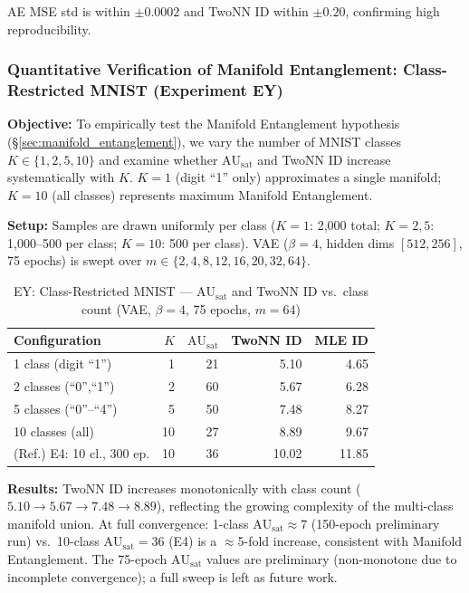 \documentclass[12pt,a4paper]{article}
\newcommand{\AUsat}{\mathrm{AU}_{\mathrm{sat}}}
\begin{document}
AE MSE std is within $\pm 0.0002$ and TwoNN ID within $\pm 0.20$, confirming high reproducibility.

\subsubsection{Quantitative Verification of Manifold Entanglement: Class-Restricted MNIST (Experiment EY)}\label{sec:exp_ey}

\textbf{Objective:}
To empirically test the Manifold Entanglement hypothesis (\S\ref{sec:manifold_entanglement}), we vary the number of MNIST classes $K \in \{1, 2, 5, 10\}$ and examine whether $\AUsat$ and TwoNN ID increase systematically with $K$.
$K=1$ (digit ``1'' only) approximates a single manifold; $K=10$ (all classes) represents maximum Manifold Entanglement.

\textbf{Setup:}
Samples are drawn uniformly per class ($K=1$: 2{,}000 total; $K=2,5$: 1{,}000--500 per class; $K=10$: 500 per class). VAE ($\beta=4$, hidden dims $[512,256]$, 75 epochs) is swept over $m \in \{2,4,8,12,16,20,32,64\}$.

\begin{table}[H]
\centering
\caption{EY: Class-Restricted MNIST --- $\AUsat$ and TwoNN ID vs.\ class count (VAE, $\beta=4$, 75 epochs, $m=64$)}
\label{tab:ey_summary}
\begin{tabular}{lrrrr}
\toprule
Configuration & $K$ & $\AUsat$ & TwoNN ID & MLE ID \\
\midrule
1 class (digit ``1'')   & 1  & 21 & 5.10 & 4.65 \\
2 classes (``0'',``1'') & 2  & 60 & 5.67 & 6.28 \\
5 classes (``0''--``4'')& 5  & 50 & 7.48 & 8.27 \\
10 classes (all)        & 10 & 27 & 8.89 & 9.67 \\
\midrule
(Ref.) E4: 10 cl., 300 ep. & 10 & 36 & 10.02 & 11.85 \\
\bottomrule
\end{tabular}
\end{table}

\textbf{Results:}
TwoNN ID increases monotonically with class count ($5.10 \to 5.67 \to 7.48 \to 8.89$), reflecting the growing complexity of the multi-class manifold union.
At full convergence: 1-class $\AUsat \approx 7$ (150-epoch preliminary run) vs.\ 10-class $\AUsat = 36$ (E4) is a $\approx$5-fold increase, consistent with Manifold Entanglement.
The 75-epoch $\AUsat$ values are preliminary (non-monotone due to incomplete convergence); a full sweep is left as future work.
\end{document}
